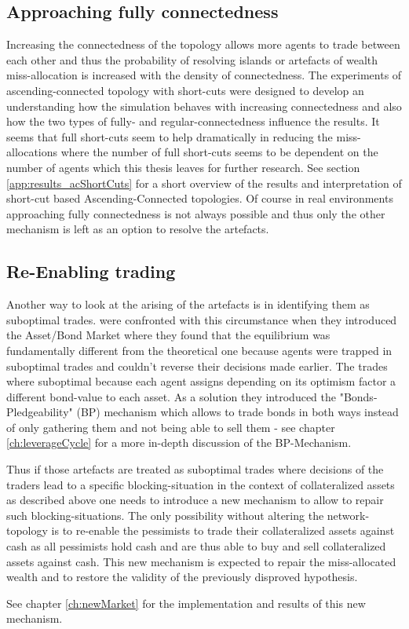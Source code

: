 \documentclass[Bachelorarbeit.tex]{subfiles}
\begin{document}
\subsection{Approaching fully connectedness}
Increasing the connectedness of the topology allows more agents to trade between each other and thus the probability of resolving islands or artefacts of wealth miss-allocation is increased with the density of connectedness. The experiments of ascending-connected topology with short-cuts were designed to develop an understanding how the simulation behaves with increasing connectedness and also how the two types of  fully- and regular-connectedness influence the results. It seems that full short-cuts seem to help dramatically in reducing the miss-allocations where the number of full short-cuts seems to be dependent on the number of agents which this thesis leaves for further research. See section \ref{app:results_acShortCuts} for a short overview of the results and interpretation of short-cut based Ascending-Connected topologies.
\linebreak
Of course in real environments approaching fully connectedness is not always possible and thus only the other mechanism is left as an option to resolve the artefacts.

\subsection{Re-Enabling trading}
\label{ch:interpretation_reenablingTrading}
Another way to look at the arising of the artefacts is in identifying them as suboptimal trades. \cite{Breuer2015} were confronted with this circumstance when they introduced the Asset/Bond Market where they found that the equilibrium was fundamentally different from the theoretical one because agents were trapped in suboptimal trades and couldn't reverse their decisions made earlier. The trades where suboptimal because each agent assigns depending on its optimism factor a different bond-value to each asset. As a solution they introduced the "Bonds-Pledgeability" (BP) mechanism which allows to trade bonds in both ways instead of only gathering them and not being able to sell them - see chapter \ref{ch:leverageCycle} for a more in-depth discussion of the BP-Mechanism.

\medskip 

Thus if those artefacts are treated as suboptimal trades where decisions of the traders lead to a specific blocking-situation in the context of collateralized assets as described above one needs to introduce a new mechanism to allow to repair such blocking-situations. The only possibility without altering the network-topology is to re-enable the pessimists to trade their collateralized assets against cash as all pessimists hold cash and are thus able to buy and sell collateralized assets against cash. This new mechanism is expected to repair the miss-allocated wealth and to restore the validity of the previously disproved hypothesis.

\medskip 

See chapter \ref{ch:newMarket} for the implementation and results of this new mechanism.
\end{document}
